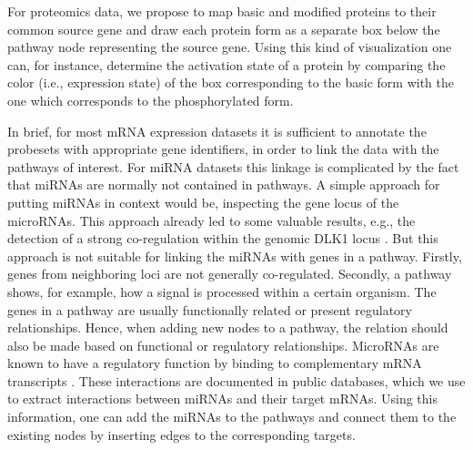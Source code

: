 \documentclass{bioinfo}
\begin{document}
For proteomics data, we propose to map basic and modified proteins to their common source gene and
draw each protein form as a separate box below the pathway node representing the source gene. Using this kind of
visualization one can, for instance, determine the activation state of a protein by comparing the color (i.e., expression state)
of the box corresponding to the basic form with the one which corresponds to the phosphorylated form.

In brief, for most mRNA expression datasets it is sufficient to annotate the probesets with appropriate
gene identifiers, in order to link the data with the pathways of interest. For miRNA datasets this linkage
is complicated by the fact that miRNAs are normally not contained in pathways.
A simple approach for putting miRNAs in context would be, inspecting the gene locus of the microRNAs. This approach already led to some valuable results, e.g., the detection of a strong co-regulation within the genomic DLK1 locus \citep{DLK1miRNA}. But this approach is not suitable for linking the miRNAs with genes in a pathway. Firstly, genes from neighboring loci are not generally co-regulated. Secondly, a pathway shows, for example, how a signal is processed within a certain organism. The genes in a pathway are usually functionally related or present regulatory relationships. Hence, when adding new nodes to a pathway, the relation should also be made based on functional or regulatory relationships. MicroRNAs are known to have a regulatory function by binding to complementary mRNA transcripts \citep{Bartel2004}. These interactions are documented in public databases, which we use to extract interactions between miRNAs and their target mRNAs. Using this information, one can add the miRNAs to the pathways and connect them to the existing nodes by inserting edges to the corresponding targets.
\end{document}
